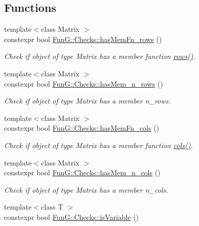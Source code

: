\subsection*{Functions}
\begin{DoxyCompactItemize}
\item 
{\footnotesize template$<$class Matrix $>$ }\\constexpr bool \hyperlink{group__ConceptCheck_ga68fd30eff9d106c399b2b0e9a1f1b822}{Fun\+G\+::\+Checks\+::has\+Mem\+Fn\+\_\+rows} ()
\begin{DoxyCompactList}\small\item\em Check if object of type Matrix has a member function \hyperlink{namespaceFunG_1_1LinearAlgebra_abd3afa2fcd2194787342b2662cfa9f5a}{rows()}. \end{DoxyCompactList}\item 
{\footnotesize template$<$class Matrix $>$ }\\constexpr bool \hyperlink{group__ConceptCheck_ga6f66adbc63ed46140f1080e9914cb5de}{Fun\+G\+::\+Checks\+::has\+Mem\+\_\+n\+\_\+rows} ()
\begin{DoxyCompactList}\small\item\em Check if object of type Matrix has a member n\+\_\+rows. \end{DoxyCompactList}\item 
{\footnotesize template$<$class Matrix $>$ }\\constexpr bool \hyperlink{group__ConceptCheck_ga4979df2d7b7abebb0253a569e41274b1}{Fun\+G\+::\+Checks\+::has\+Mem\+Fn\+\_\+cols} ()
\begin{DoxyCompactList}\small\item\em Check if object of type Matrix has a member function \hyperlink{namespaceFunG_1_1LinearAlgebra_ae981b8bee32eea3ce87f41874835c9c1}{cols()}. \end{DoxyCompactList}\item 
{\footnotesize template$<$class Matrix $>$ }\\constexpr bool \hyperlink{group__ConceptCheck_ga0a87aaa714499abcaabd921297be61e4}{Fun\+G\+::\+Checks\+::has\+Mem\+\_\+n\+\_\+cols} ()
\begin{DoxyCompactList}\small\item\em Check if object of type Matrix has a member n\+\_\+cols. \end{DoxyCompactList}\item 
{\footnotesize template$<$class T $>$ }\\constexpr bool \hyperlink{group__ConceptCheck_gac2a1a8aedf54c42cb6d47b3b64bbc761}{Fun\+G\+::\+Checks\+::is\+Variable} ()

\end{DoxyCompactItemize}
